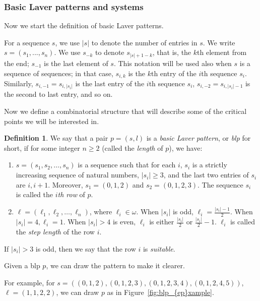 \documentclass{article}
\theoremstyle{definition}
\newtheorem{definition}[lemma]{Definition}
\theoremstyle{remark}
\begin{document}
\subsubsection*{Basic Laver patterns and systems}


Now we start the definition of basic Laver patterns.

For a sequence $s$, we use $|s|$ to denote the number of entries in $s$. We write $s=(s_1,...,s_n)$. We use $s_{-k}$ to denote $s_{|s|+1-k}$, that is, the $k$th element from the end; $s_{-1}$ is the last element of $s$. This notation will be used also when $s$ is a sequence of sequences; in that case, $s_{i,k}$ is the $k$th entry of the $i$th sequence $s_i$. Similarly, $s_{i,-1}=s_{i,|s_i|}$ is the last entry of the $i$th sequence $s_i$, $s_{i,-2} = s_{i,|s_i|-1}$ is the second to last entry, and so on. 

Now we define a combinatorial structure that will describe some of the critical points we will be interested in.

\begin{definition}
    We say that a pair $p = (s, l)$ is a \textit{basic Laver pattern}, or \textit{blp} for short, if for some integer $n \ge 2$ (called the \textit{length} of $p$), we have:

    \begin{enumerate}
        \item $s = (s_1, s_2, \dots, s_n)$ is a sequence such that for each $i$, $s_i$ is a strictly increasing sequence of natural numbers, $|s_i| \ge 3$, and the last two entries of $s_i$ are $i, i+1$. Moreover, $s_1 = (0, 1, 2)$ and $s_2 = (0, 1, 2, 3)$. The sequence $s_i$ is called the \emph{$i$th row} of $p$. 

        \item $\ell = (\ell_1, \ell_2, \dots, \ell_n)$, where $\ell_i \in \omega$. When $|s_i|$ is odd, $\ell_i=\frac{|s_i|-1}{2}$. When $|s_i|=4,\ell_i=1$. When $|s_i|>4$ is even, $\ell_i$ is either $\frac{|s_i|}{2}$ or $\frac{|s_i|}{2}-1$. $\ell_i$ is called the \textit{step length} of the row $i$.
    \end{enumerate}

    If $|s_i|>3$ is odd, then we say that the row $i$ is \textit{suitable}. 
\end{definition}

Given a blp $p$, we can draw the pattern to make it clearer.

For example, for $s = ((0, 1, 2), (0, 1, 2, 3), (0, 1, 2, 3, 4), (0, 1, 2, 4, 5))$, $\ell = (1, 1, 2, 2)$, we can draw $p$ as in Figure~\ref{fig:blp_{ep}xample}.
\end{document}
